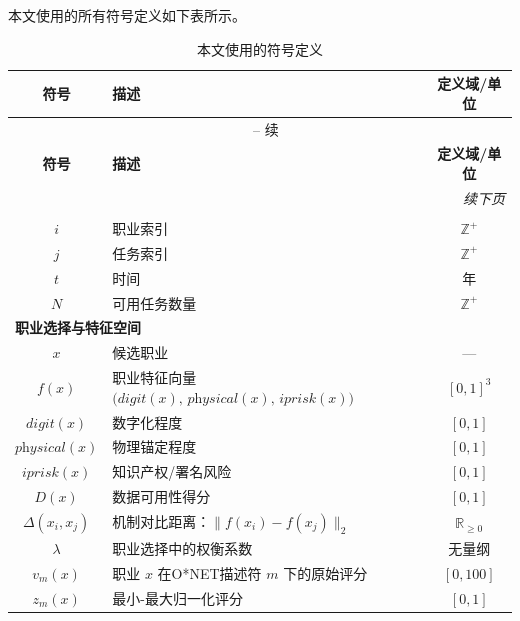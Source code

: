 本文使用的所有符号定义如下表所示。

\begin{longtable}{clc}
\caption{本文使用的符号定义} \label{tab:notation_unified} \\
\toprule
\textbf{符号} & \textbf{描述} & \textbf{定义域/单位} \\
\midrule
\endfirsthead
\multicolumn{3}{c}{\tablename\ \thetable{} -- 续} \\
\toprule
\textbf{符号} & \textbf{描述} & \textbf{定义域/单位} \\
\midrule
\endhead
\midrule
\multicolumn{3}{r}{\textit{续下页}} \\
\endfoot
\bottomrule
\endlastfoot

\multicolumn{3}{l}{\textbf{基本索引}} \\
\midrule
$i$ & 职业索引 & $\mathbb{Z}^+$ \\
$j$ & 任务索引 & $\mathbb{Z}^+$ \\
$t$ & 时间 & 年 \\
$N$ & 可用任务数量 & $\mathbb{Z}^+$ \\
\midrule

\multicolumn{3}{l}{\textbf{职业选择与特征空间}} \\
\midrule
$x$ & 候选职业 & --- \\
$f(x)$ & 职业特征向量 $\big(\textit{digit}(x),\,\textit{physical}(x),\,\textit{iprisk}(x)\big)$ & $[0,1]^3$ \\
$\textit{digit}(x)$ & 数字化程度 & $[0,1]$ \\
$\textit{physical}(x)$ & 物理锚定程度 & $[0,1]$ \\
$\textit{iprisk}(x)$ & 知识产权/署名风险 & $[0,1]$ \\
$D(x)$ & 数据可用性得分 & $[0,1]$ \\
$\Delta(x_i,x_j)$ & 机制对比距离：$\lVert f(x_i)-f(x_j)\rVert_2$ & $\mathbb{R}_{\ge 0}$ \\
$\lambda$ & 职业选择中的权衡系数 & 无量纲 \\
$v_m(x)$ & 职业 $x$ 在O*NET描述符 $m$ 下的原始评分 & $[0,100]$ \\
$z_m(x)$ & 最小-最大归一化评分 & $[0,1]$ \\
\midrule


\end{longtable}
